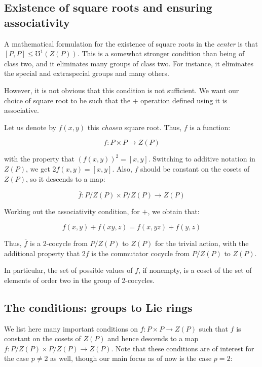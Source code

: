 \documentclass[10pt]{amsart}
\begin{document}
\subsection{Existence of square roots and ensuring associativity}

A mathematical formulation for the existence of square roots in the
{\em center} is that $[P,P] \le \mho^1(Z(P))$. This is a somewhat
stronger condition than being of class two, and it eliminates many
groups of class two. For instance, it eliminates the special and
extraspecial groups and many others.

However, it is not obvious that this condition is not sufficient. We
want our choice of square root to be such that the $+$ operation
defined using it is associative.

Let us denote by $f(x,y)$ this {\em chosen} square root. Thus, $f$ is a
function:

$$f:P \times P \to Z(P)$$

with the property that $(f(x,y))^2 =[x,y]$. Switching to additive
notation in $Z(P)$, we get $2f(x,y) = [x,y]$. Also, $f$ should be
constant on the cosets of $Z(P)$, so it descends to a map:

$$\overline{f}:P/Z(P) \times P/Z(P) \to Z(P)$$

Working out the associativity condition, for $+$, we obtain that:

$$f(x,y) + f(xy,z) = f(x,yz) + f(y,z)$$

Thus, $\overline{f}$ is a 2-cocycle from $P/Z(P)$ to $Z(P)$ for the
trivial action, with the additional property that $2f$ is the
commutator cocycle from $P/Z(P)$ to $Z(P)$.

In particular, the set of possible values of $f$, if nonempty, is a
coset of the set of elements of order two in the group of 2-cocycles.

\subsection{The conditions: groups to Lie rings}

We list here many important conditions on $f: P \times P \to Z(P)$
such that $f$ is constant on the cosets of $Z(P)$ and hence descends
to a map $\overline{f}:P/Z(P) \times P/Z(P) \to Z(P)$. Note that these
conditions are of interest for the case $p \ne 2$ as well, though our
main focus as of now is the case $p = 2$:
\end{document}
